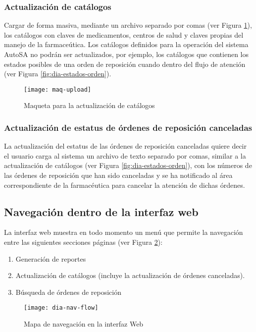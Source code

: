 \subsubsection{Actualización de catálogos}
Cargar de forma masiva, mediante un archivo separado por comas (ver Figura \ref{fig:maq-upload}), los catálogos con claves de medicamentos, centros de salud y claves propias del manejo de la farmaceútica. Los catálogos definidos para la operación del sistema AutoSA no podrán ser actualizados, por ejemplo, los catálogos que contienen los estados posibles de una orden de reposición cuando dentro del flujo de atención (ver Figura \ref{fig:dia-estados-orden}).
\begin{figure}[h]
  \centering
  \texttt{[image: maq-upload]}
  \caption{Maqueta para la actualización de catálogos}
  \label{fig:maq-upload}
\end{figure}

\subsubsection{Actualización de estatus de órdenes de reposición canceladas}
La actualización del estatus de las órdenes de reposición canceladas quiere decir el usuario carga al sistema un archivo de texto separado por comas, similar a la actualización de catálogos (ver Figura \ref{fig:dia-estados-orden}), con los números de las órdenes de reposición que han sido canceladas y se ha notificado al área correspondiente de la farmacéutica para cancelar la atención de dichas órdenes.

\subsection{Navegación dentro de la interfaz web}
La interfaz web muestra en todo momento un menú que permite la navegación entre las siguientes secciones páginas (ver Figura \ref{fig:dia-nav-flow}):
\begin{enumerate}
  \item Generación de reportes
  \item Actualización de catálogos (incluye la actualización de órdenes canceladas).
  \item Búsqueda de órdenes de reposición
\end{enumerate}
\begin{figure}[h]
  \centering
  \texttt{[image: dia-nav-flow]}
  \caption{Mapa de navegación en la interfaz Web}
  \label{fig:dia-nav-flow}
\end{figure}


